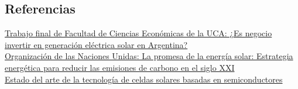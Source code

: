 \subsection{Referencias}
\href{https://repositorio.uca.edu.ar/bitstream/123456789/11949/1/Bassani%20Mariano.%20TRABAJO%20FINAL%20DE%20MBA_MB_20210311_v2.pdf}{Trabajo final de Facultad de Ciencias Económicas de la UCA: ¿Es negocio invertir en generación eléctrica solar en Argentina?}\\

\href{https://www.un.org/es/chronicle/article/la-promesa-de-la-energia-solar-estrategia-energetica-para-reducir-las-emisiones-de-carbono-en-el#:~:text=De%20acuerdo%20con%20la%20Federaci%C3%B3n,ahorrar%20600%20kilogramos%20de%20CO2}{Organización de las Naciones Unidas: La promesa de la energía solar: Estrategia energética para reducir las emisiones de carbono en el siglo XXI}\\

\href{https://ri.conicet.gov.ar/handle/11336/182578?show=full}{Estado del arte de la tecnología de celdas solares basadas en semiconductores}\\